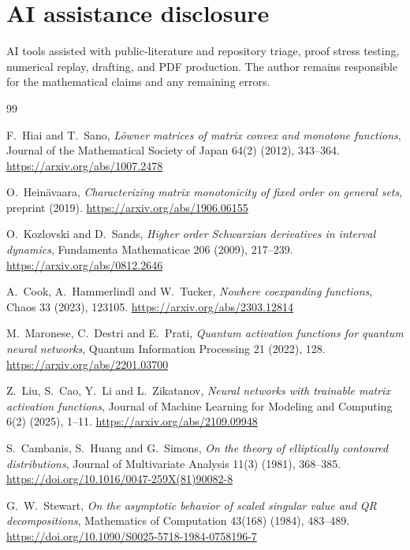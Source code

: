 \documentclass[11pt]{article}
\begin{document}
\section*{AI assistance disclosure}
AI tools assisted with public-literature and repository triage, proof stress testing, numerical replay, drafting, and
PDF production.  The author remains responsible for the mathematical claims and any remaining errors.

\begin{thebibliography}{99}
\let\oldbibitem\bibitem
\renewcommand{\bibitem}{\par\oldbibitem}
\setlength{\itemsep}{1pt}
\small
{}
F.~Hiai and T.~Sano,
\emph{L\"owner matrices of matrix convex and monotone functions},
Journal of the Mathematical Society of Japan 64(2) (2012), 343--364.
\url{https://arxiv.org/abs/1007.2478}

O.~Hein\"avaara,
\emph{Characterizing matrix monotonicity of fixed order on general sets},
preprint (2019).
\url{https://arxiv.org/abs/1906.06155}

O.~Kozlovski and D.~Sands,
\emph{Higher order Schwarzian derivatives in interval dynamics},
Fundamenta Mathematicae 206 (2009), 217--239.
\url{https://arxiv.org/abs/0812.2646}

A.~Cook, A.~Hammerlindl and W.~Tucker,
\emph{Nowhere coexpanding functions},
Chaos 33 (2023), 123105.
\url{https://arxiv.org/abs/2303.12814}

M.~Maronese, C.~Destri and E.~Prati,
\emph{Quantum activation functions for quantum neural networks},
Quantum Information Processing 21 (2022), 128.
\url{https://arxiv.org/abs/2201.03700}

Z.~Liu, S.~Cao, Y.~Li and L.~Zikatanov,
\emph{Neural networks with trainable matrix activation functions},
Journal of Machine Learning for Modeling and Computing 6(2) (2025), 1--11.
\url{https://arxiv.org/abs/2109.09948}

S.~Cambanis, S.~Huang and G.~Simons,
\emph{On the theory of elliptically contoured distributions},
Journal of Multivariate Analysis 11(3) (1981), 368--385.
\url{https://doi.org/10.1016/0047-259X(81)90082-8}

G.~W.~Stewart,
\emph{On the asymptotic behavior of scaled singular value and QR decompositions},
Mathematics of Computation 43(168) (1984), 483--489.
\url{https://doi.org/10.1090/S0025-5718-1984-0758196-7}


\end{thebibliography}
\end{document}
